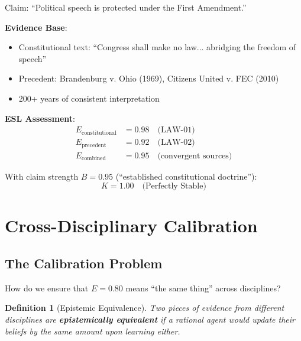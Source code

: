 \documentclass[11pt,a4paper]{article}
\newtheorem{definition}{Definition}[section]
\theoremstyle{remark}
\begin{document}
\begin{examplebox}[title={First Amendment Speech Protection}]
Claim: ``Political speech is protected under the First Amendment.''

\textbf{Evidence Base}:
\begin{itemize}
    \item Constitutional text: ``Congress shall make no law... abridging the freedom of speech''
    \item Precedent: Brandenburg v. Ohio (1969), Citizens United v. FEC (2010)
    \item 200+ years of consistent interpretation
\end{itemize}

\textbf{ESL Assessment}:
\begin{align}
E_{\text{constitutional}} &= 0.98 \quad \text{(LAW-01)} \\
E_{\text{precedent}} &= 0.92 \quad \text{(LAW-02)} \\
E_{\text{combined}} &= 0.95 \quad \text{(convergent sources)}
\end{align}

With claim strength $B = 0.95$ (``established constitutional doctrine''):
\begin{equation}
K = 1.00 \quad \text{(Perfectly Stable)}
\end{equation}
\end{examplebox}


\section{Cross-Disciplinary Calibration}
\label{sec:cross-calibration}

\subsection{The Calibration Problem}

How do we ensure that $E = 0.80$ means ``the same thing'' across disciplines?

\begin{definition}[Epistemic Equivalence]
\label{def:equivalence}
Two pieces of evidence from different disciplines are \textbf{epistemically equivalent} if a rational agent would update their beliefs by the same amount upon learning either.
\end{definition}
\end{document}
